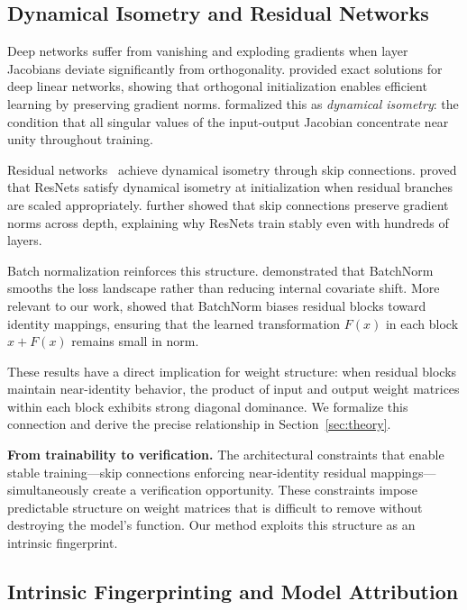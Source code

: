 \documentclass[wcp]{jmlr}
\begin{document}
\subsection{Dynamical Isometry and Residual Networks}

Deep networks suffer from vanishing and exploding gradients when layer Jacobians deviate significantly from orthogonality. \citet{saxe2014exact} provided exact solutions for deep linear networks, showing that orthogonal initialization enables efficient learning by preserving gradient norms. \citet{pennington2017isometry} formalized this as \emph{dynamical isometry}: the condition that all singular values of the input-output Jacobian concentrate near unity throughout training.

Residual networks~\citep{he2016deep} achieve dynamical isometry through skip connections. \citet{tarnowski2019dynamical} proved that ResNets satisfy dynamical isometry at initialization when residual branches are scaled appropriately. \citet{zaeemzadeh2020norm} further showed that skip connections preserve gradient norms across depth, explaining why ResNets train stably even with hundreds of layers.

Batch normalization reinforces this structure. \citet{santurkar2018does} demonstrated that BatchNorm smooths the loss landscape rather than reducing internal covariate shift. More relevant to our work, \citet{de2020batch} showed that BatchNorm biases residual blocks toward identity mappings, ensuring that the learned transformation $F(x)$ in each block $x + F(x)$ remains small in norm.

These results have a direct implication for weight structure: when residual blocks maintain near-identity behavior, the product of input and output weight matrices within each block exhibits strong diagonal dominance. We formalize this connection and derive the precise relationship in Section~\ref{sec:theory}.

\textbf{From trainability to verification.} The architectural constraints that enable stable training---skip connections enforcing near-identity residual mappings---simultaneously create a verification opportunity. These constraints impose predictable structure on weight matrices that is difficult to remove without destroying the model's function. Our method exploits this structure as an intrinsic fingerprint.

\subsection{Intrinsic Fingerprinting and Model Attribution}
\end{document}
